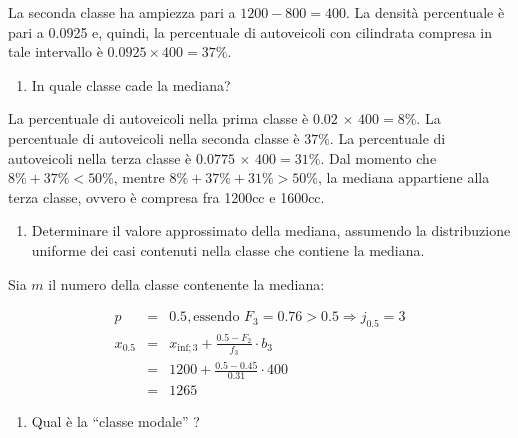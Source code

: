 \documentclass[
  11pt,
]{book}
\providecommand{\tightlist}{%
  \setlength{\itemsep}{0pt}\setlength{\parskip}{0pt}}
\theoremstyle{mytheoremstyle}
\theoremstyle{mydefstyle}
\newenvironment{sol}
  {
  \begin{tcolorbox}[enhanced,breakable,arc=0.1mm,boxrule=1pt,colback=white,colframe=iblue,
  title=\bf \fontfamily{lmss}\selectfont \hspace{.5 cm} Soluzione,drop fuzzy shadow]

}{
\end{tcolorbox}
  }
\begin{document}
\begin{sol}
La seconda classe ha ampiezza pari a \(1200 - 800 = 400\).
La densità percentuale è pari a 0.0925 e, quindi, la
percentuale di autoveicoli con cilindrata compresa in tale
intervallo è \(0.0925 \times 400 = 37\%\).

\end{sol}

\begin{enumerate}
\def\labelenumi{\alph{enumi}.}
\setcounter{enumi}{1}
\tightlist
\item
  In quale classe cade la mediana?
\end{enumerate}

\begin{sol}
La percentuale di autoveicoli nella prima classe è
\(0.02 \,\times\, 400 = 8\%\).
La percentuale di autoveicoli nella seconda classe è \(37\%\).
La percentuale di autoveicoli nella terza classe è
\(0.0775 \,\times\, 400 = 31\%\).
Dal momento che \(8\% +37\% < 50\%\), mentre
\(8\% +37\% +31\% > 50\%\), la mediana appartiene
alla terza classe, ovvero è compresa fra 1200cc e 1600cc.

\end{sol}

\begin{enumerate}
\def\labelenumi{\alph{enumi}.}
\setcounter{enumi}{2}
\tightlist
\item
  Determinare il valore approssimato della mediana,
  assumendo la distribuzione uniforme dei casi contenuti
  nella classe che contiene la mediana.
\end{enumerate}

\begin{sol}
Sia \(m\) il numero della classe contenente la mediana:

\begin{eqnarray*}
  p &=&  0.5 , \text{essendo }F_{ 3 }= 0.76  > 0.5  \Rightarrow j_{ 0.5 }= 3 \\
  x_{ 0.5 } &=& x_{\text{inf}; 3 } + \frac{ { 0.5 } - F_{ 2 }} {f_{ 3 }} \cdot b_{ 3 } \\
            &=&  1200  + \frac {{ 0.5 } -  0.45 } { 0.31 } \cdot  400  \\
            &=&  1265 
\end{eqnarray*}

\end{sol}

\begin{enumerate}
\def\labelenumi{\alph{enumi}.}
\setcounter{enumi}{3}
\tightlist
\item
  Qual è la ``classe modale'' ?
\end{enumerate}
\end{document}
